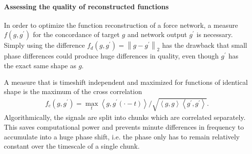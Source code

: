 \documentclass[twocolumn]{article}
\begin{document}
\paragraph{Assessing the quality of reconstructed functions}
In order to optimize the function reconstruction of a force network, a measure $f(g, g^\prime)$ for
the concordance of target $g$ and network output $g^\prime$ is necessary. Simply using the difference
$f_d(g, g^\prime) = \left\| g-g^\prime \right\|_2$ has the drawback that small phase differences could 
produce huge differences in quality, even though $g^\prime$ has the exact same shape as $g$. 

A measure that is timeshift independent and maximized for functions of identical shape is the 
maximum of the cross correlation 
\begin{align}
f_c(g, g^\prime) = \max_t \left<g, g^\prime(\cdot - t)\right> / \sqrt{\left< g, g\right> \left<g^\prime, g^\prime \right>}.
\end{align}
Algorithmically, the signals are split into chunks which are correlated separately. This saves computational power and 
prevents minute differences in frequency to accumulate into a huge phase shift, i.e. the phase only has to remain relatively
constant over the timescale of a single chunk.
\end{document}
